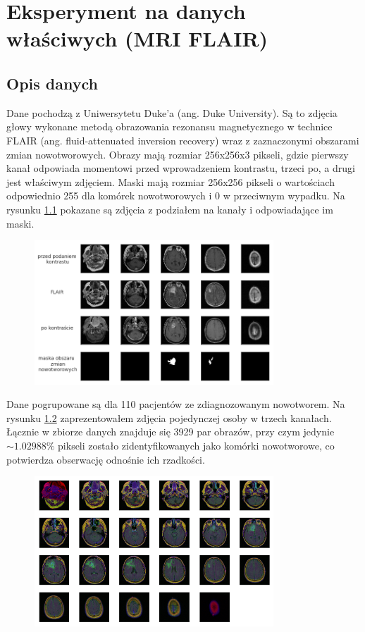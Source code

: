\chapter{Eksperyment na danych właściwych (MRI FLAIR)}

\section{Opis danych}

Dane pochodzą z Uniwersytetu Duke'a (ang. Duke University). Są to zdjęcia głowy wykonane metodą obrazowania rezonansu magnetycznego w technice FLAIR (ang. fluid-attenuated inversion recovery) wraz z zaznaczonymi obszarami zmian nowotworowych. Obrazy mają rozmiar 256x256x3 pikseli, gdzie pierwszy kanał odpowiada momentowi przed wprowadzeniem kontrastu, trzeci po, a drugi jest właściwym zdjęciem. Maski mają rozmiar 256x256 pikseli o wartościach odpowiednio 255 dla komórek nowotworowych i 0 w przeciwnym wypadku. Na rysunku \ref{fig:medical_description} pokazane są zdjęcia z podziałem na kanały i odpowiadające im maski.

\begin{figure}[h!]
    \centering
    \includegraphics[width=0.8\textwidth]{images/medical_description}
    \caption{}
    \label{fig:medical_description}
\end{figure}

Dane pogrupowane są dla 110 pacjentów ze zdiagnozowanym nowotworem. Na rysunku \ref{fig:medical_sample} zaprezentowałem zdjęcia pojedynczej osoby w trzech kanałach. Łącznie w zbiorze danych znajduje się 3929 par obrazów, przy czym jedynie $\sim1.02988\%$ pikseli zostało zidentyfikowanych jako komórki nowotworowe, co potwierdza obserwację odnośnie ich rzadkości.

\begin{figure}[h!]
    \centering
    \includegraphics[width=0.8\textwidth]{images/medical_sample}
    \caption{}
    \label{fig:medical_sample}
\end{figure}

